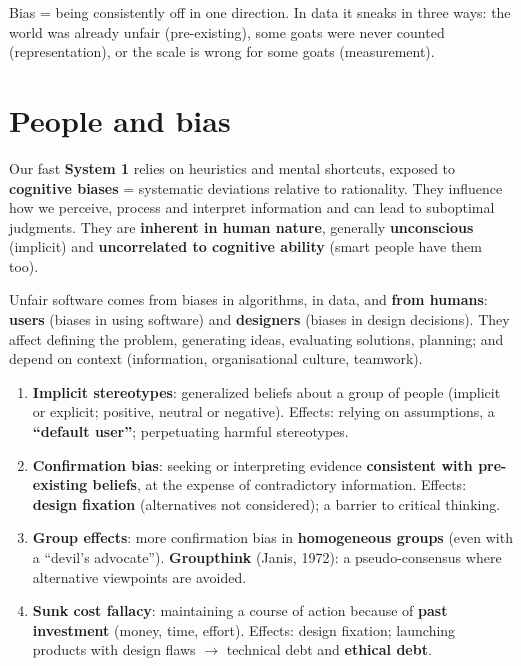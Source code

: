 \documentclass[11pt,a4paper,openany]{book}
\begin{document}
\begin{goatbox}
Bias = being consistently off in one direction. In data it sneaks in three ways: the world was
already unfair (pre-existing), some goats were never counted (representation), or the scale is
wrong for some goats (measurement).
\end{goatbox}


\section{People and bias}

\begin{defnbox}[title={Cognitive biases (Hallihan et al., 2012; Jimenez et al., 2024)}]
Our fast \textbf{System 1} relies on heuristics and mental shortcuts, exposed to
\textbf{cognitive biases} = systematic deviations relative to rationality. They influence how we
perceive, process and interpret information and can lead to suboptimal judgments. They are
\textbf{inherent in human nature}, generally \textbf{unconscious} (implicit) and
\textbf{uncorrelated to cognitive ability} (smart people have them too).
\end{defnbox}

\begin{propbox}[title={In software engineering}]
Unfair software comes from biases in algorithms, in data, and \textbf{from humans}:
\textbf{users} (biases in using software) and \textbf{designers} (biases in design decisions).
They affect defining the problem, generating ideas, evaluating solutions, planning; and depend
on context (information, organisational culture, teamwork).
\end{propbox}

\begin{defnbox}[title={Four categories of issues}]
\begin{enumerate}
  \item \textbf{Implicit stereotypes}: generalized beliefs about a group of people (implicit or
        explicit; positive, neutral or negative). Effects: relying on assumptions, a
        \textbf{``default user''}; perpetuating harmful stereotypes.
  \item \textbf{Confirmation bias}: seeking or interpreting evidence \textbf{consistent with
        pre-existing beliefs}, at the expense of contradictory information. Effects:
        \textbf{design fixation} (alternatives not considered); a barrier to critical thinking.
  \item \textbf{Group effects}: more confirmation bias in \textbf{homogeneous groups} (even with a
        ``devil's advocate''). \textbf{Groupthink} (Janis, 1972): a pseudo-consensus where
        alternative viewpoints are avoided.
  \item \textbf{Sunk cost fallacy}: maintaining a course of action because of \textbf{past
        investment} (money, time, effort). Effects: design fixation; launching products with
        design flaws $\to$ technical debt and \textbf{ethical debt}.
\end{enumerate}
\end{defnbox}
\end{document}
